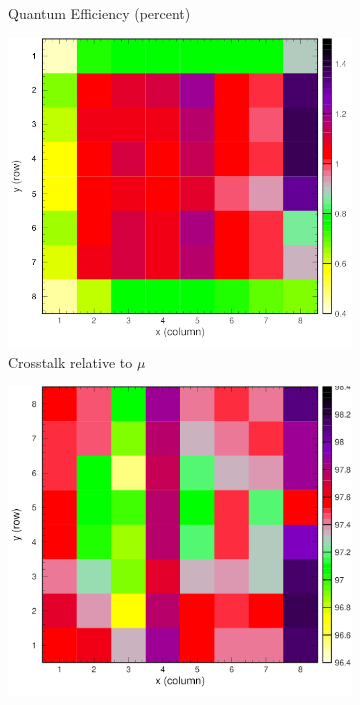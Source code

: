 \begin{figure}[t!]
\begin{subfigure}[c]{0.48\linewidth}
		\caption{Quantum Efficiency (percent)}
		\vspace{0mm}
	\end{subfigure}%
	\vspace{3mm}
	\begin{subfigure}[c]{0.48\linewidth}
		\centering
		\includegraphics[width=\linewidth]{figures/pglobal_beta.png}
		\caption{Crosstalk relative to $\mu$}
		\vspace{0mm}
	\end{subfigure}%
	\begin{subfigure}[c]{0.48\linewidth}
		\centering
		\includegraphics[width=\linewidth]{figures/pglobal_eff2d.png}

\end{subfigure}
\end{figure}
